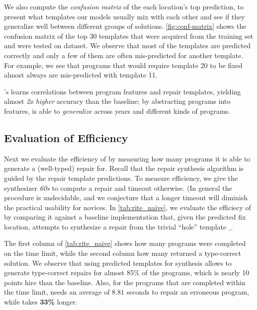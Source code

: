 %
We also compute the \emph{confusion matrix} of the each location's 
top prediction, to present what templates our models usually mix 
with each other and see if they generalize well between different 
groups of solutions. 
%
\autoref{fig:conf-matrix} shows the confusion matrix of the 
top 30 templates that were acquired from the training set 
and were tested on \FALL dataset.
%
We observe that most of the templates are predicted correctly 
and only a few of them are often mis-predicted for another template. 
%
For example, we see that programs that would require template 20 
to be fixed almost always are mis-predicted with template 11.


\begin{framed}
  \noindent \toolname's learns correlations between program features and repair 
  templates, yielding almost \emph{2x higher} accuracy than the baseline;
  by abstracting programs into features, \toolname is able 
  to \emph{generalize} across years and different kinds of programs.
\end{framed}


\subsection{Evaluation of Efficiency}
\label{sec:eval:efficiency}
\label{subsec:eval:man_rep_qual_eval}

Next we evaluate the efficiency of \toolname by measuring how many 
programs it is able to generate a (well-typed) repair for.
%
Recall that the repair synthesis algorithm is guided by the 
repair template predictions.
%
To measure efficiency, we give the synthesizer \emph{60s} to 
compute a repair and timeout otherwise. (In general the procedure 
is undecidable, and we conjecture that a longer timeout will diminish 
the practical usability for novices.
%
In \autoref{tab:rite_naive}, we evaluate the efficiecy of \toolname
by comparing it against a baseline \naive implementation that, given 
the predicted fix location, attempts to synthesize a repair from the 
trivial ``hole'' template $\_$.

The first column of \autoref{tab:rite_naive} shows how many 
programs were completed on the time limit, while the second 
column how many returned a type-correct solution. 
%
We observe that using predicted templates for synthesis allows 
\toolname to generate type-correct repairs for almost 85\% of 
the programs, which is nearly 10 points hire than the \naive 
baseline. Also, for the programs that are completed within 
the time limit, \toolname needs an average of $8.81$ seconds 
to repair an erroneous program, while \naive takes 
\textbf{33\%} longer.

